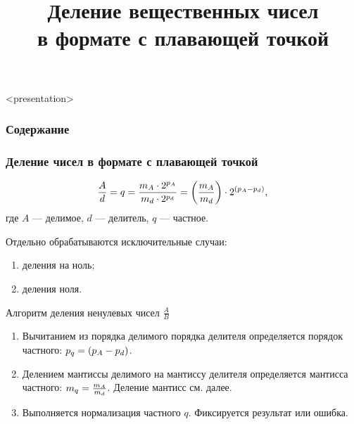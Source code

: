 


\title[Деление в формате с ПЗ]{Деление вещественных чисел \\ в формате с плавающей точкой}

\setcounter{TaskSimpleCtr}{1}
\newcommand{\TaskSimpleNumber}{ \arabic{TaskSimpleCtr}) \addtocounter{TaskSimpleCtr}{1} }




\begin{frame}<presentation>
    \frametitle{Содержание}
    \tableofcontents
\end{frame}


\begin{frame}
    \frametitle{Деление чисел в формате с плавающей точкой}
    
    \[
        \frac{A}{d}=q=
        \frac{m_{A}\cdot {2}^{p_{A}}}{m_{d}\cdot {2}^{p_{d}}}=\left(\frac{m_{A}}{m_{d}}\right)\cdot 2^{(p_{A}-p_{d})},
    \]
    где $A$ --- делимое, $d$ --- делитель, $q$ --- частное.
    
    Отдельно обрабатываются исключительные случаи:
    \begin{enumerate}
        \item деления на ноль;
        \item деления ноля.
    \end{enumerate}
    
    Алгоритм деления ненулевых чисел $\frac{A}{B}$
    \begin{enumerate}
        \item Вычитанием из порядка делимого порядка делителя определяется порядок частного: $p_{q}=(p_{A}-p_{d})$.
        \item Делением мантиссы делимого на мантиссу делителя определяется мантисса частного: $m_{q}=\frac{m_{A}}{m_{d}}$. Деление мантисс см. далее.
        \item Выполняется нормализация частного $q$. Фиксируется результат или ошибка.
    \end{enumerate}
\end{frame}

